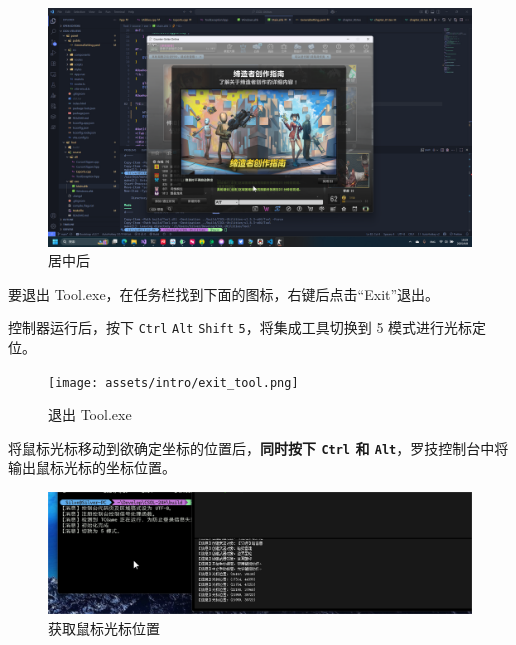 \begin{figure}[H]
    \Centering
    \includegraphics[width=\textwidth]{assets/after_center.png}
    \caption{居中后}
    \label{ch2fig-after-center}
\end{figure}

要退出 Tool.exe，在任务栏找到下面的图标，右键后点击“Exit”退出。

控制器运行后，按下 \lstinline{Ctrl} \lstinline{Alt} \lstinline{Shift} \lstinline{5}，将集成工具切换到 5 模式进行光标定位。

\begin{figure}[H]
    \Centering
    \texttt{[image: assets/intro/exit\_tool.png]}
    \caption{退出 Tool.exe}
\end{figure}

将鼠标光标移动到欲确定坐标的位置后，\textbf{\color{red}同时按下 \lstinline{Ctrl} 和 \lstinline{Alt}}，罗技控制台中将输出鼠标光标的坐标位置。

\begin{figure}[H]
    \Centering
    \includegraphics[width=\textwidth]{assets/position.png}
    \caption{获取鼠标光标位置}
\end{figure}